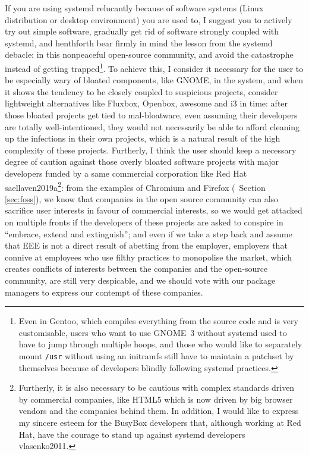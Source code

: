 If you are using systemd relucantly because of software systems (Linux
distribution or desktop environment) you are used to, I suggest you to actively
try out simple software, gradually get rid of software strongly coupled with
systemd, and henthforth bear firmly in mind the lesson from the systemd debacle:
in this nonpeaceful open-source community,  and avoid the catastrophe instead of getting
trapped\footnote{Even in Gentoo, which compiles everything from the source code
and is very customisable, users who want to use GNOME~3 without systemd used to
have to jump through multiple hoops, and those who would
like to separately mount \texttt{/usr} without using an initramfs still have to
maintain a patchset by themselves because of developers
blindly following systemd practices.}.  To achieve
this, I consider it necessary for the user to be especially wary of bloated
components, like GNOME, in the system, and when it shows the tendency to be
closely coupled to suspicious projects, consider lightweight alternatives like
Fluxbox, Openbox, awesome and i3 in time: after those bloated projects get tied
to mal-bloatware, even assuming their developers are totally well-intentioned,
they would not necessarily be able to afford cleaning up the infections in
their own projects, which is a natural result of the
high complexity of these projects.  Furtherly, I think the user should keep a
necessary degree of caution against those overly bloated software projects with
major developers funded by a same commercial corporation like Red Hat\cupercite%
{saellaven2019a}\footnote{Furtherly, it is also necessary to be cautious with
complex standards driven by commercial companies, like HTML5 which is now driven
by big browser vendors and the companies behind them.  In addition, I would like
to express my sincere esteem for the BusyBox developers that, although working
at Red Hat, have the courage to stand up against systemd developers\cupercite%
{vlasenko2011}.}: from the examples of Chromium and Firefox (\cf~Section~%
\ref{sec:foss}), we know that companies in the open source community can also
sacrifice user interests in favour of commercial interests, so we would get
attacked on multiple fronts if the developers of these projects are asked to
conspire in ``embrace, extend and extinguish''; and even if we take a step
back and assume that EEE is not a direct result of abetting from the employer,
employers that connive at employees who use filthy practices to monopolise
the market, which creates conflicts of interests between the companies and
the open-source community, are still very despicable, and we should vote
with our package managers to express our contempt of these companies.


